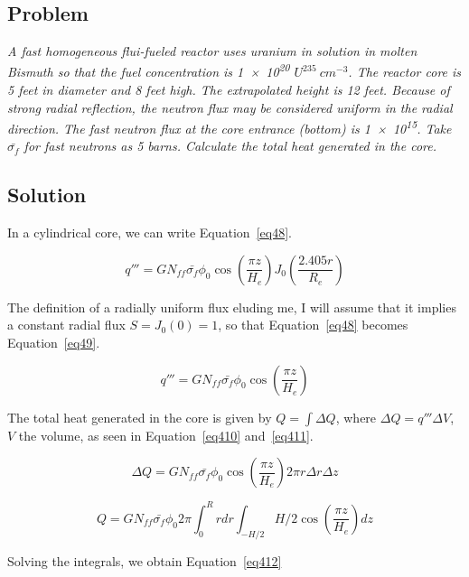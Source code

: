\subsection{Problem}
\textit{A fast homogeneous flui-fueled reactor uses uranium in solution in molten Bismuth so that the fuel concentration is \num{1e20} $U^{235}\ cm^{-3}$. The reactor core is 5 feet in diameter and 8 feet high. The extrapolated height is 12 feet. Because of strong radial reflection, the neutron flux may be considered uniform in the radial direction. The fast neutron flux at the core entrance (bottom) is \num{1e15}. Take $\bar{\sigma_f}$ for fast neutrons as 5 barns. Calculate the total heat generated in the core.}

\subsection{Solution}

In a cylindrical core, we can write Equation~\ref{eq48}.

\begin{equation}\label{eq48}
q''' = G N_{ff} \bar{\sigma_{f}} \phi_0 \cos(\frac{\pi z}{H_e}) J_0(\frac{2.405r}{R_e})
\end{equation}

The definition of a radially uniform flux eluding me, I will assume that it implies a constant radial flux $S = J_0(0) = 1$, so that Equation~\ref{eq48} becomes Equation~\ref{eq49}.

\begin{equation}\label{eq49}
q''' = G N_{ff} \bar{\sigma_{f}} \phi_0 \cos(\frac{\pi z}{H_e})
\end{equation}

The total heat generated in the core is given by $Q = \int \Delta Q$, where $\Delta Q = q''' \Delta V$, $V$ the volume, as seen in Equation~\ref{eq410} and~\ref{eq411}.


\begin{equation}\label{eq410}
\Delta Q = G N_{ff} \bar{\sigma_{f}} \phi_0 \cos(\frac{\pi z}{H_e}) 2\pi r\Delta r \Delta z
\end{equation}


\begin{equation}\label{eq411}
Q = G N_{ff} \bar{\sigma_{f}} \phi_0 2\pi \int_0^{R} r dr \int_{-H/2}{H/2} \cos(\frac{\pi z}{H_e}) dz
\end{equation}

Solving the integrals, we obtain Equation~\ref{eq412}

